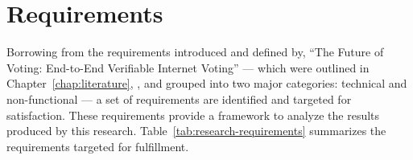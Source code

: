 \section{Requirements}\label{sec:requirements}
Borrowing from the requirements introduced and defined by, ``The Future of
Voting: End-to-End Verifiable Internet Voting''\cite{e2e-viv} --- which were
outlined in Chapter~\ref{chap:literature}, \emph{}, and
grouped into two major categories: technical and non-functional --- a set of
requirements are identified and targeted for satisfaction. These requirements
provide a framework to analyze the results produced by this research.
Table~\ref{tab:research-requirements} summarizes the requirements targeted for
fulfillment.

